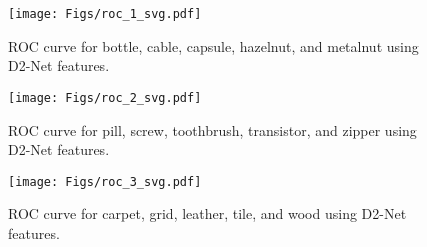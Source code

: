 \documentclass[journal]{IEEEtran}
\let\MYoriglatexcaption\caption
\renewcommand{\caption}[2][\relax]{\MYoriglatexcaption[#2]{#2}}
\begin{document}
\begin{figure}[!ht]
    \centering
    \texttt{[image: Figs/roc\_1\_svg.pdf]}
    \caption{ROC curve for bottle, cable, capsule, hazelnut, and metalnut using D2-Net features.}
    \label{fig:ROC_curve_mvtec_1}
\end{figure}    
\begin{figure}[!ht]
\centering
    \texttt{[image: Figs/roc\_2\_svg.pdf]}
      \caption{ROC curve for pill, screw, toothbrush, transistor, and zipper using D2-Net features.}
    \label{fig:ROC_curve_mvtec_2}
\end{figure}
\begin{figure}[!ht]
\centering
     \texttt{[image: Figs/roc\_3\_svg.pdf]}
    \caption{ROC curve for carpet, grid, leather, tile, and wood using D2-Net features.}
    \label{fig:ROC_curve_mvtec_3}
\end{figure}
\end{document}
